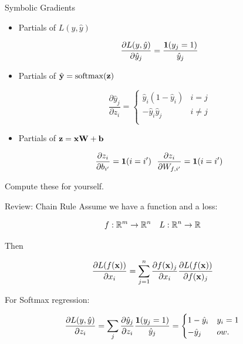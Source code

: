 \documentclass{beamer}
\begin{document}
\begin{frame}{Symbolic Gradients}
  
  \begin{itemize}
  \item 

  Partials of $L(y, \hat{y})$

  \[ \frac{\partial L(y, \hat{y})}{\partial \hat{y}_j} = \frac{\mathbf{1}(y_j = 1)} {\hat{y}_j}  \]
  \pause 

  \item
    Partials of $\hat{\boldy} = \softmax(\boldz)$ 

  \[ \frac{\partial \hat{y}_j }{\partial z_i} =
    \begin{cases}
      \hat{y}_i (1 - \hat{y}_i) & i = j\\
      - \hat{y}_i \hat{y}_j & i \neq j \\
    \end{cases} \]

  \pause 
  \item Partials of $\mathbf{z}  = \mathbf{x} \mathbf{W} + \mathbf{b} $ 

  \[ \frac{\partial z_i }{\partial b_{i'}} = \mathbf{1}(i = i') \ \  \frac{\partial z_i }{\partial W_{f, i'}} = \mathbf{1}(i = i') \]

  \end{itemize}

   Compute these for yourself.
\end{frame}

\begin{frame}{Review: Chain Rule}
  Assume we have a function and a loss:

  \[ f : \reals^m \rightarrow \reals^n \ \ \  L : \reals^n \rightarrow \reals \] 

  Then 

  \[ \frac{\partial L(f(\mathbf{x}))}{\partial x_i} = \sum_{j =1}^n \frac{\partial f(\mathbf{x})_j} {\partial  x_i} \frac{\partial L(f(\mathbf{x}))} {\partial f(\mathbf{x})_j}   \]

  \pause

  For Softmax regression:
  
  \[ \frac{\partial L(y, \hat{y})}{\partial z_i} = \sum_{j} \frac{\partial \hat{y}_j }{\partial z_i}  \frac{\mathbf{1}(y_j = 1)} {\hat{y}_j} =     \begin{cases}
      1 - \hat{y}_i & y_i = 1\\
      -\hat{y}_j & ow. \\
    \end{cases} \] 
\end{frame}
\end{document}
